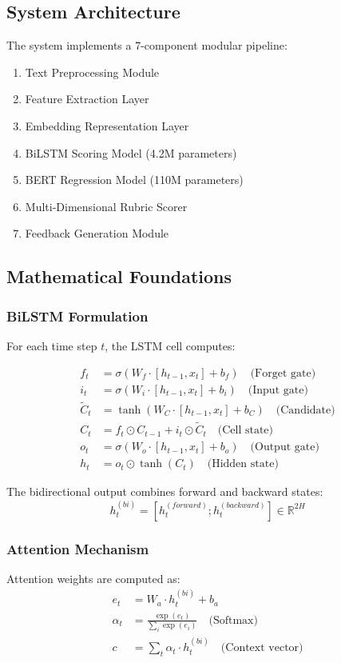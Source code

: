 \documentclass[12pt,a4paper]{article}
\begin{document}
\subsection{System Architecture}
The system implements a 7-component modular pipeline:
\begin{enumerate}
    \item Text Preprocessing Module
    \item Feature Extraction Layer
    \item Embedding Representation Layer
    \item BiLSTM Scoring Model (4.2M parameters)
    \item BERT Regression Model (110M parameters)
    \item Multi-Dimensional Rubric Scorer
    \item Feedback Generation Module
\end{enumerate}

\subsection{Mathematical Foundations}

\subsubsection{BiLSTM Formulation}
For each time step $t$, the LSTM cell computes:

\begin{align}
f_t &= \sigma(W_f \cdot [h_{t-1}, x_t] + b_f) \quad \text{(Forget gate)} \\
i_t &= \sigma(W_i \cdot [h_{t-1}, x_t] + b_i) \quad \text{(Input gate)} \\
\tilde{C}_t &= \tanh(W_C \cdot [h_{t-1}, x_t] + b_C) \quad \text{(Candidate)} \\
C_t &= f_t \odot C_{t-1} + i_t \odot \tilde{C}_t \quad \text{(Cell state)} \\
o_t &= \sigma(W_o \cdot [h_{t-1}, x_t] + b_o) \quad \text{(Output gate)} \\
h_t &= o_t \odot \tanh(C_t) \quad \text{(Hidden state)}
\end{align}

The bidirectional output combines forward and backward states:
\begin{equation}
h_t^{(bi)} = [h_t^{(forward)}; h_t^{(backward)}] \in \mathbb{R}^{2H}
\end{equation}

\subsubsection{Attention Mechanism}
Attention weights are computed as:
\begin{align}
e_t &= W_a \cdot h_t^{(bi)} + b_a \\
\alpha_t &= \frac{\exp(e_t)}{\sum_i \exp(e_i)} \quad \text{(Softmax)} \\
c &= \sum_t \alpha_t \cdot h_t^{(bi)} \quad \text{(Context vector)}
\end{align}
\end{document}
